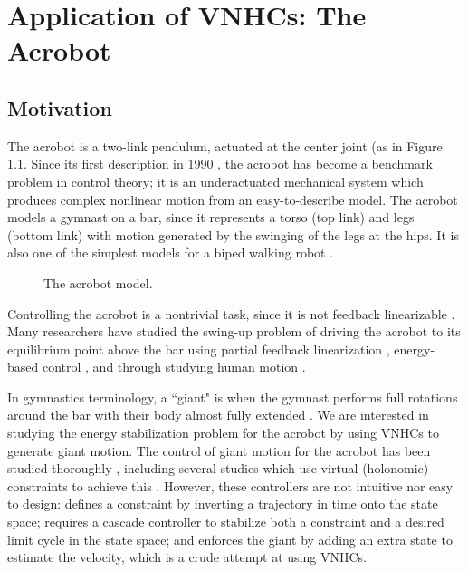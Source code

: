 

\chapter{Application of VNHCs: The Acrobot}\label{ch:acrobot}
\section{Motivation}
The acrobot is a two-link pendulum, actuated at the center joint (as in Figure
\ref{fig:acrobot-model}. Since its first description in 1990 
\cite{nonlinear_controllers_nonintegrable_acrobot}, the
acrobot has become a benchmark problem in control theory; it is an
underactuated mechanical system which produces
complex nonlinear motion from an easy-to-describe model.
The acrobot models a gymnast on a bar,
since it represents a torso (top link) and legs (bottom link) with motion
generated by the swinging of the legs at the hips. It is also one of the
simplest models for a biped walking robot
\cite{toward_framework_biped_locomotion}.

\begin{figure}
    \centering
    \caption{The acrobot model.}%
    \label{fig:acrobot-model}
\end{figure}

Controlling the acrobot is a nontrivial task, since it is not feedback
linearizable \cite{nonlinear_controllers_nonintegrable_acrobot}. Many
researchers have studied the swing-up problem of driving the acrobot to its
equilibrium point above the bar using partial feedback linearization
\cite{swingup_problem_acrobot}, energy-based control
\cite{swingup_acrobot_pendulum, swingup_acrobot_energy}, and through studying
human motion \cite{swingup_giant_acrobot, motion_control_gymnastic_skill}.

In gymnastics terminology, a ``giant" is when the gymnast performs full
rotations around the bar with their body almost fully extended
\cite{usagym_giant}. We are interested in studying the energy stabilization
problem for the acrobot by using VNHCs to generate giant motion. The control of
giant motion for the acrobot has been studied thoroughly 
\cite{energy_pumping_robotic_swinging, swingup_giant_acrobot,
control_giant_two_link_gymnastic_robot}, including several studies which use
virtual (holonomic) constraints to achieve this
\cite{dynamical_servo_acrobot_vc, control_giant_two_link_gymnastic_robot,
xingbo_thesis}. However, these controllers are not intuitive nor easy to design:
\cite{control_giant_two_link_gymnastic_robot} defines a constraint by inverting
a trajectory in time onto the state space; \cite{dynamical_servo_acrobot_vc}
requires a cascade controller to stabilize both a constraint and a desired limit
cycle in the state space; and \cite{xingbo_thesis} enforces the giant by adding
an extra state to estimate the velocity, which is a crude attempt at using
VNHCs.

